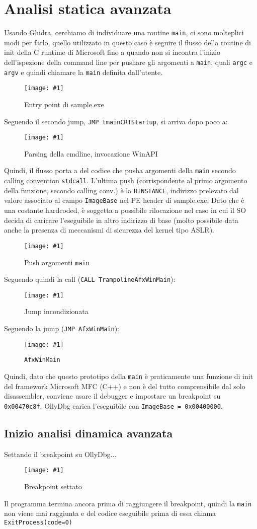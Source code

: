 \documentclass[
    a4paper, %
    11pt %
]{article}
\newcommand{\pic}[4]{\begin{figure}[H]
            \centering
            \texttt{[image: \#1]}
            \caption{#2}
            \label{fig:#1}
            \end{figure}}
\begin{document}
        \section{Analisi statica avanzata}
            Usando Ghidra, cerchiamo di individuare una routine \texttt{main}, ci sono molteplici modi
            per farlo, quello utilizzato in questo caso è seguire il flusso della routine di init
            della C runtime di Microsoft fino a quando non si incontra l'inizio dell'ispezione
            della command line per pushare gli argomenti a \texttt{main}, quali \texttt{argc} e
            \texttt{argv} e quindi chiamare la \texttt{main} definita dall'utente.
            \pic{entry}{Entry point di sample.exe}{9cm}{4cm}
            Seguendo il secondo jump, \texttt{JMP \textunderscore\textunderscore tmainCRTStartup},
            si arriva dopo poco a:
            \pic{provide_main_args}{Parsing della cmdline, invocazione WinAPI}{12cm}{5cm}
            Quindi, il flusso porta a del codice che pusha argomenti della \texttt{main} secondo calling
            convention \texttt{\textunderscore\textunderscore stdcall}.
            L'ultima push (corrispondente al primo argomento della funzione, secondo calling conv.) è la 
            \texttt{HINSTANCE}, indirizzo prelevato dal valore associato al campo \texttt{ImageBase} nel PE header di sample.exe. Dato che 
            è una costante hardcoded, è soggetta a possibile rilocazione nel caso in cui il SO decida
            di caricare l'eseguibile in altro indirizzo di base (molto possibile data anche la 
            presenza di meccanismi di sicurezza del kernel tipo ASLR).
            \pic{afxwinmain_trampoline_call}{Push argomenti \texttt{main}}{14cm}{5cm}
            Seguendo quindi la call (\texttt{CALL Trampoline\textunderscore AfxWinMain}):
            \pic{afxwinmain_jmp}{Jump incondizionata}{15cm}{7cm}
            Seguendo la jump (\texttt{JMP AfxWinMain}):
            \pic{afxwinmain}{\texttt{AfxWinMain}}{14cm}{5cm}
            Quindi, dato che questo prototipo della \texttt{main} è praticamente una funzione di init
            del framework Microsoft MFC (C++) e non è del tutto comprensibile dal solo disassembler, 
            conviene usare il debugger e impostare un breakpoint su \texttt{0x00470c8f}.
            OllyDbg carica l'eseguibile con \texttt{ImageBase = 0x00400000}.

            \subsection{Inizio analisi dinamica avanzata}
            Settando il breakpoint su OllyDbg...
            \pic{odbg1brkp}{Breakpoint settato}{16cm}{5cm}
            Il programma termina ancora prima di raggiungere il breakpoint, quindi la \texttt{main} non 
            viene mai raggiunta e del codice eseguibile prima di essa chiama \texttt{ExitProcess(code=0)}
\end{document}
